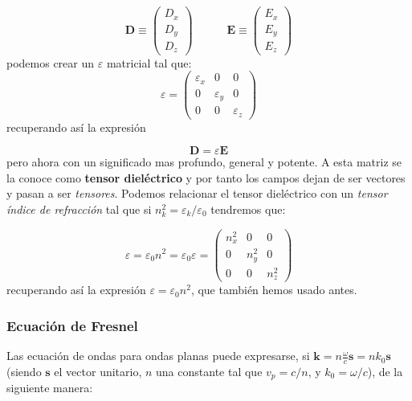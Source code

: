 \documentclass[12pt,a4paper]{article}
\newcommand{\tquad}{\quad \quad \quad}
\newcommand{\En}{\mathbf{E}}
\newcommand{\Dn}{\mathbf{D}}
\newcommand{\kn}{\mathbf{k}}
\newcommand{\sn}{\mathbf{s}}
\numberwithin{equation}{section}
\numberwithin{figure}{section}
\begin{document}
\begin{equation}
\Dn \equiv \begin{pmatrix}
D_x \\
D_y  \\
D_z 
\end{pmatrix} \tquad \En \equiv \begin{pmatrix}
E_x \\
E_y \\
E_z
\end{pmatrix} 
\end{equation}
podemos crear un $\varepsilon$ matricial tal que:
\begin{equation}
\varepsilon = \begin{pmatrix}
\varepsilon_x & 0 & 0 \\
0 & \varepsilon_y & 0 \\
0 & 0 & \varepsilon_z 
\end{pmatrix}
\end{equation}
recuperando así la expresión 


\begin{equation}
\Dn = \varepsilon \En
\end{equation}
pero ahora con un significado mas profundo, general y potente. A esta matriz se la conoce como \textbf{tensor dieléctrico} y por tanto los campos dejan de ser vectores y pasan a ser \textit{tensores}. Podemos relacionar el tensor dieléctrico con un \textit{tensor índice de refracción} tal que si $n_k^2 = \varepsilon_k / \varepsilon_0$ tendremos que:


\begin{equation}
\varepsilon = \varepsilon_0 n^2 = \varepsilon_0 
\varepsilon = \begin{pmatrix}
n_x^2 & 0 & 0 \\
0 & n^2_y & 0 \\
0 & 0 & n^2_z 
\end{pmatrix}
\end{equation}
recuperando así la expresión $\varepsilon=\varepsilon_0 n^2$, que también hemos usado antes.



\subsubsection{Ecuación de Fresnel}

Las ecuación de ondas para ondas planas puede expresarse, si $\kn = n \frac{\omega}{c} \sn = n k_0 \sn$ (siendo $\sn$ el vector unitario, $n$ una constante tal que $v_p = c /n$, y $k_0 = \omega /c$), de la siguiente manera:
\end{document}
